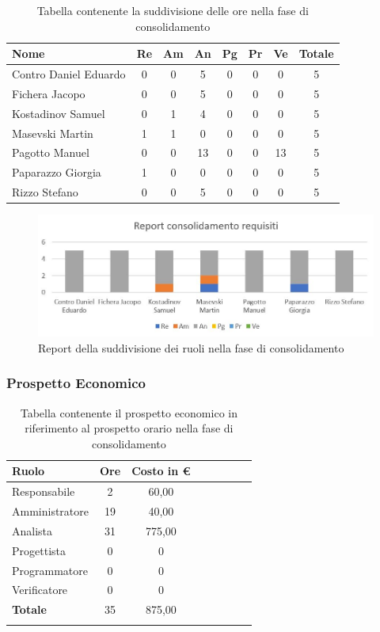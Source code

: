 \documentclass[../piano_di_progetto.tex]{subfiles}
\begin{document}
\begin{table}[!ht]

	\centering
	\begin{tabular}{|l|c|c|c|c|c|c|c|}
	\hline
	\rowcolor{lightgray}
	\textbf{Nome} & \textbf{Re} & \textbf{Am} & \textbf{An} & \textbf{Pg}  & \textbf{Pr}   & \textbf{Ve} & \textbf{Totale} \\

	\hline
		Contro Daniel Eduardo & 0 & 0 & 5 & 0 & 0 & 0  & 5 \\
	\hline
		Fichera Jacopo & 0 & 0 & 5 & 0 & 0 & 0 & 5 \\
	\hline
		Kostadinov Samuel & 0 & 1 & 4 & 0 & 0 & 0 & 5 \\			
	\hline
		Masevski Martin & 1 & 1 & 0 & 0 & 0 & 0 & 5 \\
	\hline
		Pagotto Manuel & 0 & 0 & 13 & 0 & 0 & 13 & 5 \\			
	\hline
		Paparazzo Giorgia & 1 & 0 & 0 & 0 & 0 & 0 & 5 \\
	\hline
		Rizzo Stefano & 0 & 0 & 5 & 0 & 0 & 0 & 5 \\
	\hline	
	\end{tabular}
	\caption{Tabella contenente la suddivisione delle ore nella fase di consolidamento}
\end{table}

\begin{figure}[H]
\centering
\includegraphics[width=12cm]{img/report_consolidamento}
\caption{Report della suddivisione dei ruoli nella fase di consolidamento}
\end{figure}

\subsubsection{Prospetto Economico}

\begin{longtable}{|l|c|c|c|c|c|c|c|}
	\hline
	\rowcolor{lightgray}
	\textbf{Ruolo} & \textbf{Ore} & \textbf{Costo in €}\\
	\endhead
	\hline
	Responsabile & 2 & 60,00 \\
	\hline
	Amministratore & 19 & 40,00 \\
	\hline
	Analista & 31 & 775,00 \\
	\hline
	Progettista & 0 & 0 \\
	\hline
	Programmatore & 0 & 0 \\
	\hline
	Verificatore & 0 & 0 \\
	\hline
	\textbf{Totale} & 35 & 875,00 \\
	\hline
	\caption{Tabella contenente il prospetto economico in riferimento al prospetto orario nella fase di consolidamento} 
\end{longtable}
\end{document}
